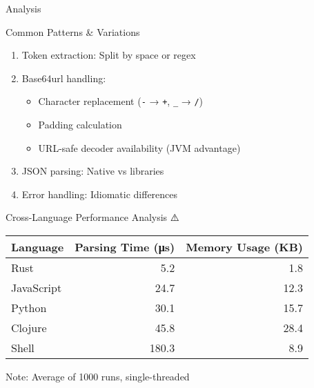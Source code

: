 \documentclass[presentation,aspectratio=169]{beamer}
\begin{document}
\begin{frame}[label={sec:org6c8891c},fragile]{Analysis}
 \begin{block}{Common Patterns \& Variations 🧩}
\begin{enumerate}[<+->]
\item \alert{Token extraction}: Split by space or regex
\item \alert{Base64url handling}:
\begin{itemize}
\item Character replacement (\texttt{-} → \texttt{+}, \texttt{\_} → \texttt{/})
\item Padding calculation
\item URL-safe decoder availability (JVM advantage)
\end{itemize}
\item \alert{JSON parsing}: Native vs libraries
\item \alert{Error handling}: Idiomatic differences
\end{enumerate}
\end{block}
\begin{block}{Cross-Language Performance Analysis ⚠️}
\begin{center}
\begin{tabular}{lrr}
Language & Parsing Time (μs) & Memory Usage (KB)\\
\hline
Rust & 5.2 & 1.8\\
JavaScript & 24.7 & 12.3\\
Python & 30.1 & 15.7\\
Clojure & 45.8 & 28.4\\
Shell & 180.3 & 8.9\\
\end{tabular}
\end{center}

\alert{Note: Average of 1000 runs, single-threaded}
\end{block}
\end{frame}
\end{document}
